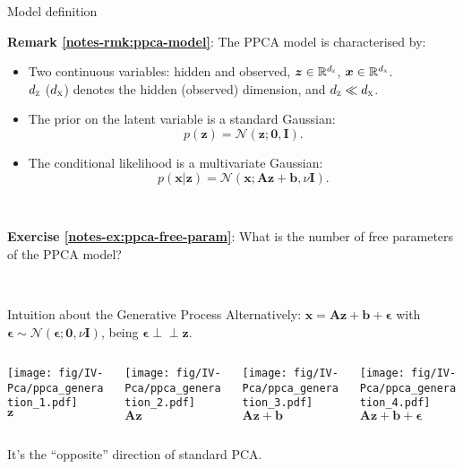 \documentclass{beamer}
\newcommand{\indep}{\perp\!\!\!\perp}
\newcommand{\bs}[1]{\boldsymbol{#1}}
\newcommand{\exercise}[2]{\noindent\colorbox{blue!10}{\parbox{0.995\textwidth}{\textbf{Exercise \ref{notes-ex:#1}}: #2}}\\}
\newcommand{\remark}[2]{\noindent\colorbox{red!10}{\parbox{0.995\textwidth}{\textbf{Remark \ref{notes-rmk:#1}}: #2}}\\}
\begin{document}
\begin{frame}{Model definition}
\remark{ppca-model}{The PPCA model is characterised by:
\begin{itemize}
 \item Two continuous variables: hidden and observed, $\bs{z}\in\mathbb{R}^{d_{\textsc{z}}}$, $\bs{x}\in\mathbb{R}^{d_{\textsc{x}}}$.\\ $d_{\textsc{z}}$ ($d_{\textsc{x}}$) denotes the hidden (observed) dimension, and $d_{\textsc{z}} \ll d_{\textsc{x}}$.
 \item The prior on the latent variable is a standard Gaussian:
 \[
  p(\bs{z}) = \mathcal{N}(\bs{z};\bs{0},\bs{I}).
 \]
 \item The conditional likelihood is a multivariate Gaussian:
 \[
  p(\bs{x}|\bs{z}) = \mathcal{N}(\bs{x};\bs{A}\bs{z}+\bs{b},\nu\bs{I}).
 \]
\end{itemize}}\pause\vspace{3mm}
\exercise{ppca-free-param}{What is the number of free parameters of the PPCA model?}
\end{frame}

\begin{frame}{Intuition about the Generative Process}
Alternatively: $\bs{x}=\bs{A}\bs{z}+\bs{b}+\bs{\epsilon}$ with $\bs{\epsilon}\sim\mathcal{N}(\bs{\epsilon};\bs{0},\nu\bs{I})$, being $\bs{\epsilon} \indep \bs{z}$.\vspace{\baselineskip}

\begin{columns}[b]
 \begin{column}{0.22\textwidth}
 \centering
  \texttt{[image: fig/IV-Pca/ppca\_generation\_1.pdf]}\\ $\bs{z}$
 \end{column}\hfill
 \begin{column}{0.22\textwidth}
 \centering
  \texttt{[image: fig/IV-Pca/ppca\_generation\_2.pdf]}\\ $\bs{A}\bs{z}$
 \end{column}\hfill
  \begin{column}{0.22\textwidth}
  \centering
  \texttt{[image: fig/IV-Pca/ppca\_generation\_3.pdf]}\\ $\bs{A}\bs{z}+\bs{b}$
 \end{column}\hfill
  \begin{column}{0.22\textwidth}
  \centering
  \texttt{[image: fig/IV-Pca/ppca\_generation\_4.pdf]}\\ $\bs{A}\bs{z}+\bs{b}+\bs{\epsilon}$
 \end{column}
\end{columns}\vspace{\baselineskip}
It's the ``opposite'' direction of standard PCA.
\end{frame}
\end{document}
